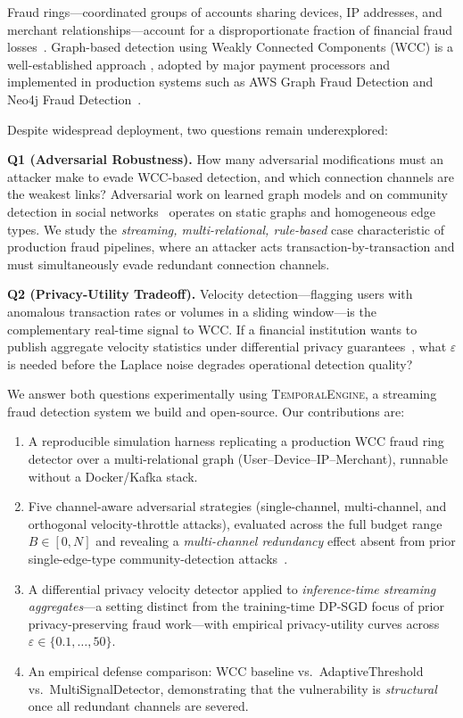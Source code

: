 \documentclass[sigconf,nonacm]{acmart}
\newcommand{\sysname}{\textsc{TemporalEngine}\xspace}
\newcommand{\wcc}{\textsc{WCC}\xspace}
\newcommand{\eps}{\varepsilon}
\begin{document}
Fraud rings---coordinated groups of accounts sharing devices, IP addresses,
and merchant relationships---account for a disproportionate fraction of
financial fraud losses~\cite{pourhabibi2020}.  Graph-based detection using
Weakly Connected Components (\wcc) is a well-established approach
\cite{akoglu2015,liu2021,liu2018heterogeneous}, adopted by major payment
processors and implemented in production systems such as AWS Graph Fraud
Detection and Neo4j Fraud Detection~\cite{weber2019}.

Despite widespread deployment, two questions remain underexplored:

\textbf{Q1 (Adversarial Robustness).}  How many adversarial modifications
must an attacker make to evade \wcc-based detection, and which connection
channels are the weakest links?  Adversarial work on learned graph models
\cite{zugner2018,dai2018,kim2024fraudgangs} and on community detection in
social networks~\cite{li2020adversarial,jia2020certified} operates on static
graphs and homogeneous edge types.  We study the \emph{streaming,
multi-relational, rule-based} case characteristic of production fraud
pipelines, where an attacker acts transaction-by-transaction and must
simultaneously evade redundant connection channels.

\textbf{Q2 (Privacy-Utility Tradeoff).}  Velocity detection---flagging
users with anomalous transaction rates or volumes in a sliding window---is
the complementary real-time signal to \wcc.  If a financial institution
wants to publish aggregate velocity statistics under differential privacy
guarantees~\cite{dwork2014}, what $\eps$ is needed before the Laplace noise
degrades operational detection quality?

We answer both questions experimentally using \sysname, a streaming fraud
detection system we build and open-source.  Our contributions are:

\begin{enumerate}
  \item A reproducible simulation harness replicating a production \wcc
        fraud ring detector over a multi-relational graph
        (User--Device--IP--Merchant), runnable without a Docker/Kafka stack.
  \item Five channel-aware adversarial strategies (single-channel,
        multi-channel, and orthogonal velocity-throttle attacks), evaluated
        across the full budget range $B \in [0,N]$ and revealing a
        \emph{multi-channel redundancy} effect absent from prior single-edge-type
        community-detection attacks~\cite{li2020adversarial}.
  \item A differential privacy velocity detector applied to \emph{inference-time
        streaming aggregates}---a setting distinct from the training-time
        DP-SGD focus of prior privacy-preserving fraud work---with empirical
        privacy-utility curves across $\eps \in \{0.1, \ldots, 50\}$.
  \item An empirical defense comparison: \wcc baseline vs.\ AdaptiveThreshold
        vs.\ MultiSignalDetector, demonstrating that the vulnerability is
        \emph{structural} once all redundant channels are severed.
\end{enumerate}
\end{document}
